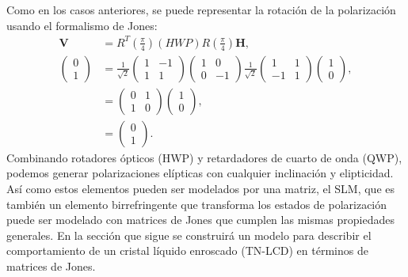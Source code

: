 Como en los casos anteriores, se puede representar la rotación de la
polarización usando el formalismo de Jones:
\begin{align*}
\mathbf{V} &=
R^{T}\left(\frac{\pi}{4}\right)\left(HWP\right)R\left(\frac{\pi}{4}\right)\mathbf{H},\\ 
\begin{pmatrix}
0\\1
\end{pmatrix}&=
 \frac{1}{\sqrt{2}}
\begin{pmatrix}
  1 &-1\\1&1
\end{pmatrix}
\begin{pmatrix} 1
  &0\\0&-1 \end{pmatrix}
 \frac{1}{\sqrt{2}}
\begin{pmatrix}
1&1\\-1&1
\end{pmatrix}
\begin{pmatrix}
1\\ 0
\end{pmatrix},
\\
&=
\begin{pmatrix}
0  & 1 \\1 & 0
\end{pmatrix}
\begin{pmatrix}
1\\ 0
\end{pmatrix},\\&=
\begin{pmatrix}
0\\1
\end{pmatrix}.
\end{align*}
Combinando rotadores ópticos (HWP) y retardadores de cuarto de onda
(QWP), 
podemos generar polarizaciones elípticas con cualquier inclinación y
elipticidad. Así como estos elementos pueden ser modelados por una
matriz, el SLM, que es también un elemento birrefringente que
transforma los estados de polarización puede ser modelado con matrices
de Jones que cumplen las mismas propiedades generales. 
En la sección que sigue se construirá un modelo para describir el
comportamiento de un cristal líquido enroscado (TN-LCD) en términos de
matrices de Jones.

